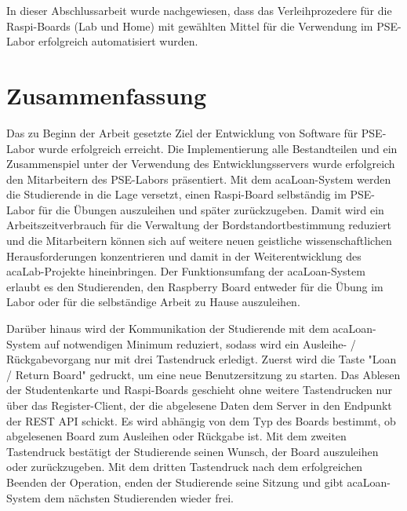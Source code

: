In dieser Abschlussarbeit wurde nachgewiesen, dass das Verleihprozedere für die Raspi-Boards (Lab und Home) mit gewählten Mittel für die Verwendung im PSE-Labor erfolgreich automatisiert wurden. 

\chapter{Zusammenfassung}
\label{sec:results}
Das zu Beginn der Arbeit gesetzte Ziel der Entwicklung von Software für PSE-Labor wurde erfolgreich erreicht. Die Implementierung alle Bestandteilen und ein Zusammenspiel unter der Verwendung des Entwicklungsservers wurde erfolgreich den Mitarbeitern des PSE-Labors präsentiert. Mit dem acaLoan-System werden die Studierende in die Lage versetzt, einen Raspi-Board selbständig im PSE-Labor für die Übungen auszuleihen und später zurückzugeben. Damit wird ein Arbeitszeitverbrauch für die Verwaltung der Bordstandortbestimmung reduziert und die Mitarbeitern können sich auf weitere neuen geistliche wissenschaftlichen Herausforderungen konzentrieren und damit in der Weiterentwicklung des acaLab-Projekte hineinbringen.  Der Funktionsumfang der acaLoan-System erlaubt es den Studierenden, den Raspberry Board entweder für die Übung im Labor oder für die selbständige Arbeit zu Hause auszuleihen. 

Darüber hinaus wird der Kommunikation der Studierende mit dem acaLoan-System auf notwendigen Minimum reduziert, sodass wird ein Ausleihe- / Rückgabevorgang nur mit drei Tastendruck erledigt. Zuerst wird die Taste "Loan / Return Board" gedruckt, um eine neue Benutzersitzung zu starten. Das Ablesen der Studentenkarte und Raspi-Boards geschieht ohne weitere Tastendrucken nur über das Register-Client, der die abgelesene Daten dem Server in den Endpunkt der REST API schickt. Es wird abhängig von dem Typ des Boards bestimmt, ob abgelesenen Board zum Ausleihen oder Rückgabe ist. Mit dem zweiten Tastendruck bestätigt der Studierende seinen Wunsch, der Board auszuleihen oder zurückzugeben. Mit dem dritten Tastendruck nach dem erfolgreichen Beenden der Operation, enden der Studierende seine Sitzung und gibt acaLoan-System dem nächsten Studierenden wieder frei. 

